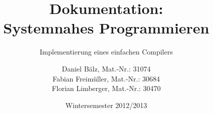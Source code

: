 \documentclass[a4paper,titlepage,12pt]{scrreprt}
\begin{document}
\titlehead{
	\texttt{[image: hska\_logo]}
}

\title{Dokumentation: \\ Systemnahes Programmieren}
\subtitle{Implementierung eines einfachen Compilers}
\author{%
	Daniel Bälz, Mat.-Nr.: 31074 \\
	Fabian Freimüller, Mat.-Nr.: 30684 \\
	Florian Limberger, Mat.-Nr.: 30470
}
\date{Wintersemester 2012/2013}
\publishers{
    \textbf{Betreuer:} Prof.\,Dr. Thomas Fuchß
}
\maketitle

\tableofcontents

\clearpage









\end{document}
